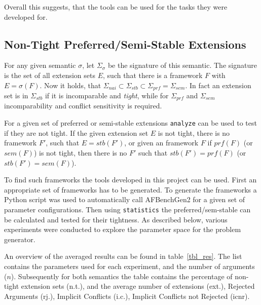 \documentclass[parskip=half]{scrartcl}
\begin{document}
Overall this suggests, that the tools can be used for the tasks they were
developed for.

\subsection{Non-Tight Preferred/Semi-Stable Extensions}
For any given semantic $\sigma$, let $\Sigma_{\sigma}$ be the signature of this
semantic. The signature is the set of all extension sets $E$, such that there is
a framework $F$ with $E=\sigma(F)$. Now it holds, that $\Sigma_{nai}\subset
\Sigma_{stb}\subset\Sigma_{prf}=\Sigma_{sem}$. In fact an extension set is in
$\Sigma_{stb}$ if it is incomparable and \emph{tight}, while for $\Sigma_{prf}$
and $\Sigma_{sem}$ incomparability and conflict sensitivity is required.

For a given set of preferred or semi-stable extensions \texttt{analyze} can
be used to test if they are not tight. If the given extension set $E$ is not
tight, there is no framework $F'$, such that $E=stb(F')$, or given an framework
$F$ if $prf(F)$ (or $sem(F)$) is not tight, then there is no $F'$ such that
$stb(F')=prf(F)$ (or $stb(F')=sem(F)$).

To find such frameworks the tools developed in this project can be used. First
an appropriate set of frameworks has to be generated. To generate the frameworks
a Python script was used to automatically call AFBenchGen2 for a given
set of parameter configurations. Then using \texttt{statistics} the
preferred/sem-stable can be calculated and tested for their tightness. As
described below, various experiments were conducted to explore the parameter
space for the problem generator.

An overview of the averaged results can be found in table~\ref{tbl_res}. The
list contains the parameters used for each experiment, and the number of arguments
($n$). Subsequently for both semantics the table contains the percentage of
non-tight extension sets (n.t.), and the average number of extensions (ext.),
Rejected Arguments (rj.), Implicit Conflicts (i.c.), Implicit Conflicts not
Rejected (icnr).
\end{document}
